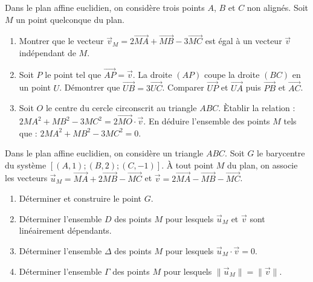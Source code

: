 %
\begin{exo}
      Dans le plan affine euclidien, on consid\`ere trois points $A$, $B$ et $C$ non align\'es.
      Soit $M$ un point quelconque du plan.
            \begin{enumerate}
                  \item Montrer que le vecteur $\vec{v}_M = 2 \overrightarrow{MA} + \overrightarrow{MB} - 3 \overrightarrow{MC}$
                        est \'egal \`a un vecteur $\vec{v}$ ind\'ependant de $M$.
                  \item Soit $P$ le point tel que $\overrightarrow{AP} = \vec{v}$.
                        La droite $(AP)$ coupe la droite $(BC)$ en un point $U$.
                        D\'emontrer que $\overrightarrow{UB} = 3 \overrightarrow{UC}$.
                        Comparer $\overrightarrow{UP}$ et $\overrightarrow{UA}$ puis $\overrightarrow{PB}$ et $\overrightarrow{AC}$.
                  \item Soit $O$ le centre du cercle circonscrit au triangle $ABC$.
                        \`Etablir la relation : $2 MA^2 + MB^2 - 3 MC^2 = 2 \overrightarrow{MO} \cdot \vec{v}$.
                        En d\'eduire l'ensemble des points $M$ tels que : $2 MA^2 + MB^2 - 3 MC^2 = 0$.
            \end{enumerate}
\end{exo}
%
\begin{exo}
      Dans le plan affine euclidien, on consid\`ere un triangle $ABC$.
      Soit $G$ le barycentre du syst\`eme $[(A,1) ; (B,2) ; (C,-1)]$.
      \`A tout point $M$ du plan, on associe les vecteurs 
            $\vec{u}_{\!\!M} = \overrightarrow{MA} + 2 \overrightarrow{MB} - \overrightarrow{MC}$ et
            $\vec{v} = 2 \overrightarrow{MA} - \overrightarrow{MB} - \overrightarrow{MC}$.
            \begin{enumerate}
                  \item D\'eterminer et construire le point $G$.
                  \item D\'eterminer l'ensemble $D$ des points $M$ pour lesquels 
                        $\vec{u}_M$ et $\vec{v}$ sont lin\'eairement d\'ependants.
                  \item D\'eterminer l'ensemble $\Delta$ des points $M$ pour lesquels $\vec{u}_{\!\!M} \cdot \vec{v} = 0$.
                  \item D\'eterminer l'ensemble $\Gamma$ des points $M$ pour lesquels $\| \vec{u}_{\!\!M} \| = \| \vec{v} \|$.
            \end{enumerate}
\end{exo}
